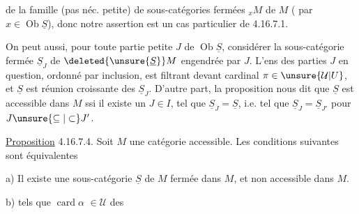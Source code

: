de la famille (pas néc. petite) de sous-catégories
fermées $ {}_xM$ de $M$ ( par
$x\in\operatorname{Ob}\underline S$),  donc notre assertion est un
cas particulier de 4.16.7.1.

On peut aussi, pour toute partie petite
$J$ de $\operatorname{Ob}\underline S$, considérer la sous-catégorie
fermée $\underline S_J$ de $\deleted{\unsure{\underline S}}M$ engendrée
par $J$. L'ens  des parties $J$ en
question, ordonné par inclusion, est
filtrant devant  cardinal $\pi\in\unsure{\mathcal U|U}$, et
$\underline S$ est réunion croissante des $\underline S_J$.
D'autre part, la proposition nous dit
que $\underline S$ est accessible dans $M$ ssi
 il existe un $J\in I$, tel que $\underline S_J=\underline S$,
i.e. tel que $\underline S_J=\underline S_{J'}$ pour $J\unsure{\subseteq|\subset}J'$.

\uline{Proposition} 4.16.7.4. Soit $M$ une catégorie
accessible. Les conditions suivantes
sont équivalentes

a) Il existe une sous-catégorie $\underline S$ de $M$
fermée dans $M$, et non accessible dans $M$.

b)  
tels que $\operatorname{card}\alpha$ \deleted{\unsure{$\leq$}} $\in\mathcal U$  des
